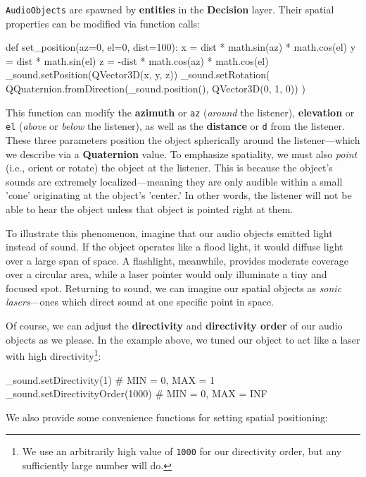 \documentclass{report}
\newcommand{\state}[1]{\textbf{#1}}
\newcommand{\decision}{\textbf{Decision}\xspace}
\newcommand{\tech}[1]{\textbf{#1}}
\begin{document}
\texttt{AudioObjects} are spawned by \state{entities} in the \decision layer. Their spatial properties can be modified via function calls:

\begin{codeblock}
def set_position(az=0, el=0, dist=100):
    x = dist * math.sin(az) * math.cos(el)
    y = dist * math.sin(el)
    z = -dist * math.cos(az) * math.cos(el)
    _sound.setPosition(QVector3D(x, y, z))
    _sound.setRotation(
        QQuaternion.fromDirection(_sound.position(), QVector3D(0, 1, 0))
    )
\end{codeblock}

This function can modify the \tech{azimuth} or \texttt{az} (\emph{around} the listener), \tech{elevation} or \texttt{el} (\emph{above} or \emph{below} the listener), as well as the \tech{distance} or \texttt{d} from the listener. These three parameters position the object spherically around the listener---which we describe via a \tech{Quaternion} value. To emphasize spatiality, we must also \emph{point} (i.e., orient or rotate) the object at the listener. This is because the object's sounds are extremely localized---meaning they are only audible within a small 'cone' originating at the object's 'center.' In other words, the listener will not be able to hear the object unless that object is pointed right at them. 

To illustrate this phenomenon, imagine that our audio objects emitted light instead of sound. If the object operates like a flood light, it would diffuse light over a large span of space. A flashlight, meanwhile, provides moderate coverage over a circular area, while a laser pointer would only illuminate a tiny and focused spot. Returning to sound, we can imagine our spatial objects as \emph{sonic lasers}---ones which direct sound at one specific point in space. 

Of course, we can adjust the \tech{directivity} and \tech{directivity order} of our audio objects as we please. In the example above, we tuned our object to act like a laser with high directivity\footnote{We use an arbitrarily high value of \texttt{1000} for our directivity order, but any sufficiently large number will do.}:

\begin{codeblock}
    _sound.setDirectivity(1) # MIN = 0, MAX = 1
    _sound.setDirectivityOrder(1000) # MIN = 0, MAX = INF
\end{codeblock}

We also provide some convenience functions for setting spatial positioning:
\end{document}
